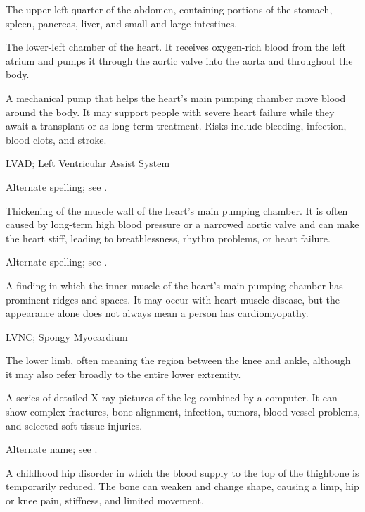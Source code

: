  The upper-left quarter of the abdomen, containing portions of the stomach, spleen, pancreas, liver, and small and large intestines.

 The lower-left chamber of the heart. It receives oxygen-rich blood from the left atrium and pumps it through the aortic valve into the aorta and throughout the body.

 A mechanical pump that helps the heart's main pumping chamber move blood around the body. It may support people with severe heart failure while they await a transplant or as long-term treatment. Risks include bleeding, infection, blood clots, and stroke.

\synonyms
LVAD; Left Ventricular Assist System

 Alternate spelling; see .

 Thickening of the muscle wall of the heart's main pumping chamber. It is often caused by long-term high blood pressure or a narrowed aortic valve and can make the heart stiff, leading to breathlessness, rhythm problems, or heart failure.

 Alternate spelling; see .

 A finding in which the inner muscle of the heart's main pumping chamber has prominent ridges and spaces. It may occur with heart muscle disease, but the appearance alone does not always mean a person has cardiomyopathy.

\synonyms
LVNC; Spongy Myocardium

 The lower limb, often meaning the region between the knee and ankle, although it may also refer broadly to the entire lower extremity.

 A series of detailed X-ray pictures of the leg combined by a computer. It can show complex fractures, bone alignment, infection, tumors, blood-vessel problems, and selected soft-tissue injuries.

 Alternate name; see .

 A childhood hip disorder in which the blood supply to the top of the thighbone is temporarily reduced. The bone can weaken and change shape, causing a limp, hip or knee pain, stiffness, and limited movement.

